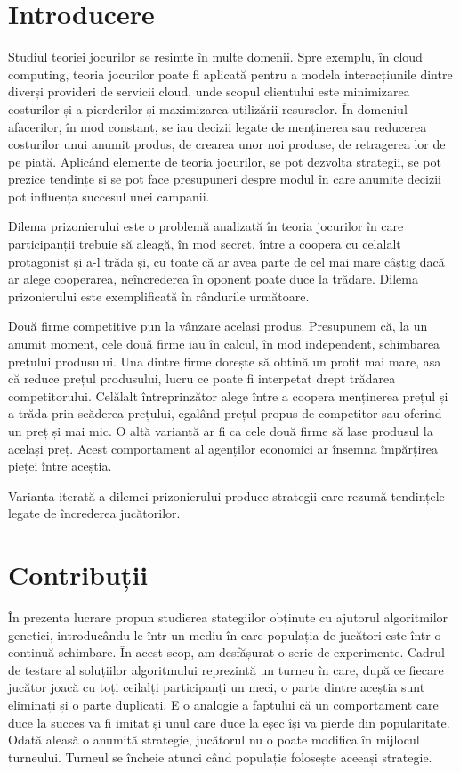 \chapter*{Introducere}

Studiul teoriei jocurilor se resimte în multe domenii. Spre exemplu, în cloud computing, teoria jocurilor poate fi aplicată pentru a modela interacțiunile dintre diverși provideri de servicii cloud, unde scopul clientului este minimizarea costurilor și a pierderilor și maximizarea utilizării resurselor. În domeniul afacerilor, în mod constant, se iau decizii legate de menținerea sau reducerea costurilor unui anumit produs, de crearea unor noi produse, de retragerea lor de pe piață. Aplicând elemente de teoria jocurilor, se pot dezvolta strategii, se pot prezice tendințe și se pot face presupuneri despre modul în care anumite decizii pot influența succesul unei campanii. 

Dilema prizonierului este o problemă analizată în teoria jocurilor în care participanții trebuie să aleagă, în mod secret, între a coopera cu celalalt protagonist și a-l trăda și, cu toate că ar avea parte de cel mai mare câștig dacă ar alege cooperarea, neîncrederea în oponent poate duce la trădare.  Dilema prizonierului este exemplificată în rândurile următoare. 
 
Două firme competitive pun la vânzare același produs. Presupunem că, la un anumit moment, cele două firme iau în calcul, în mod independent, schimbarea prețului produsului. Una dintre firme dorește să obtină un profit mai mare, așa că reduce prețul produsului, lucru ce poate fi interpetat drept trădarea competitorului. Celălalt întreprinzător alege între a coopera menținerea prețul și a trăda prin scăderea prețului, egalând prețul propus de competitor sau oferind un preț și mai mic. O altă variantă ar fi ca cele două firme să lase produsul la același preț. Acest comportament al agenților economici ar însemna împărțirea pieței între aceștia. 
  
Varianta iterată a dilemei prizonierului produce strategii care rezumă tendințele legate de încrederea jucătorilor.  

\chapter*{Contribuții}

În prezenta lucrare propun studierea stategiilor obținute cu ajutorul algoritmilor genetici, introducându-le într-un mediu în care populația de jucători este într-o continuă schimbare. În acest scop, am desfășurat o serie de experimente. Cadrul de testare al soluțiilor algoritmului reprezintă un turneu în care, după ce fiecare jucător joacă cu toți ceilalți participanți un meci, o parte dintre aceștia sunt eliminați și o parte duplicați. E o analogie a faptului că un comportament care duce la succes va fi imitat și unul care duce la eșec își va pierde din popularitate.  Odată aleasă o anumită strategie, jucătorul nu o poate modifica în mijlocul turneului. Turneul se încheie atunci când populație folosește aceeași strategie. 
 
